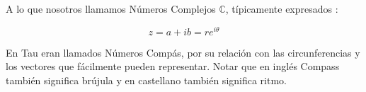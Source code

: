 \documentclass[preview]{standalone}
\begin{document}
\begin{center}
A lo que nosotros llamamos Números Complejos $\mathbb{C}$, típicamente expresados :

$$z=a+ib=re^{i\theta}$$ 

En Tau eran llamados Números Compás, por su relación con las  circunferencias y los vectores que fácilmente pueden representar.
Notar que en inglés Compass también significa brújula y en castellano también significa ritmo.
\end{center}
\end{document}
